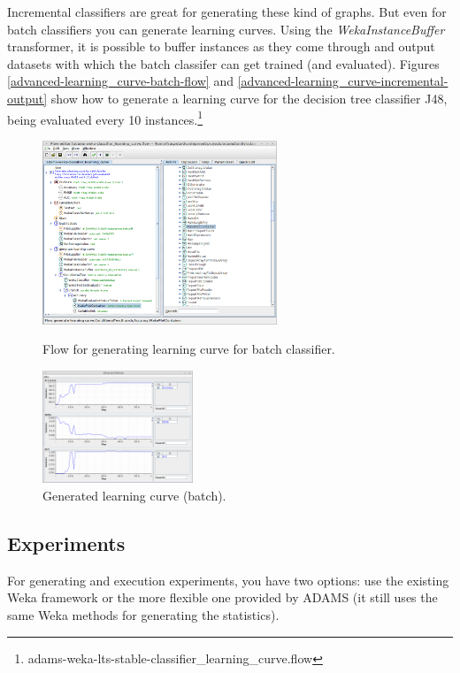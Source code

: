 Incremental classifiers are great for generating these kind of graphs. But
even for batch classifiers you can generate learning curves. Using the 
\textit{WekaInstanceBuffer} transformer, it is possible to buffer instances as
they come through and output datasets with which the batch classifer can get
trained (and evaluated). Figures \ref{advanced-learning_curve-batch-flow} and
\ref{advanced-learning_curve-incremental-output} show how to generate a 
learning curve for the decision tree classifier J48, being evaluated every
10 instances.\footnote{adams-weka-lts-stable-classifier\_learning\_curve.flow}

\begin{figure}[ht]
  \begin{minipage}[t]{0.55\linewidth}
    \centering
    \includegraphics[width=7.0cm]{images/advanced-learning_curve-batch-flow.png}
    \caption{Flow for generating learning curve for batch classifier.}
    \label{advanced-learning_curve-batch-flow}
  \end{minipage}
  \hspace{0.5cm}
  \begin{minipage}[t]{0.45\linewidth}
    \centering
    \includegraphics[width=4.5cm]{images/advanced-learning_curve-batch-output.png}
    \caption{Generated learning curve (batch).}
    \label{advanced-learning_curve-batch-output}
  \end{minipage}
\end{figure}

\subsection{Experiments}
For generating and execution experiments, you have two options: use the
existing Weka framework or the more flexible one provided by ADAMS (it
still uses the same Weka methods for generating the statistics).

